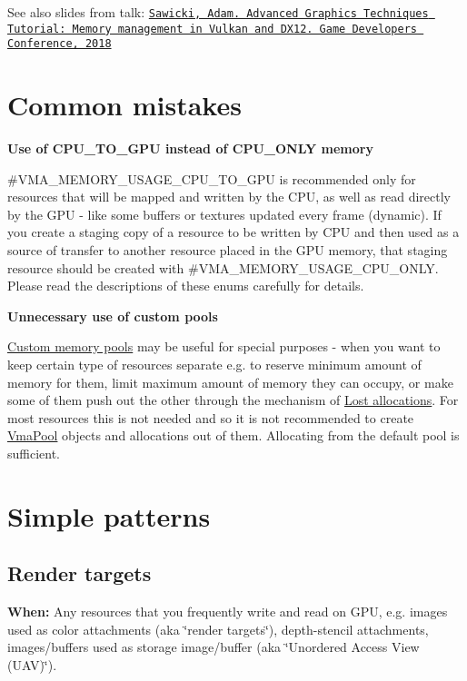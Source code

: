 See also slides from talk\+: \href{https://www.gdcvault.com/play/1025458/Advanced-Graphics-Techniques-Tutorial-New}{\tt Sawicki, Adam. Advanced Graphics Techniques Tutorial\+: Memory management in Vulkan and D\+X12. Game Developers Conference, 2018}\hypertarget{usage_patterns_usage_patterns_common_mistakes}{}\section{Common mistakes}\label{usage_patterns_usage_patterns_common_mistakes}
{\bfseries Use of C\+P\+U\+\_\+\+T\+O\+\_\+\+G\+PU instead of C\+P\+U\+\_\+\+O\+N\+LY memory}

\#\+V\+M\+A\+\_\+\+M\+E\+M\+O\+R\+Y\+\_\+\+U\+S\+A\+G\+E\+\_\+\+C\+P\+U\+\_\+\+T\+O\+\_\+\+G\+PU is recommended only for resources that will be mapped and written by the C\+PU, as well as read directly by the G\+PU -\/ like some buffers or textures updated every frame (dynamic). If you create a staging copy of a resource to be written by C\+PU and then used as a source of transfer to another resource placed in the G\+PU memory, that staging resource should be created with \#\+V\+M\+A\+\_\+\+M\+E\+M\+O\+R\+Y\+\_\+\+U\+S\+A\+G\+E\+\_\+\+C\+P\+U\+\_\+\+O\+N\+LY. Please read the descriptions of these enums carefully for details.

{\bfseries Unnecessary use of custom pools}

\hyperlink{custom_memory_pools}{Custom memory pools} may be useful for special purposes -\/ when you want to keep certain type of resources separate e.\+g. to reserve minimum amount of memory for them, limit maximum amount of memory they can occupy, or make some of them push out the other through the mechanism of \hyperlink{lost_allocations}{Lost allocations}. For most resources this is not needed and so it is not recommended to create \hyperlink{structVmaPool}{Vma\+Pool} objects and allocations out of them. Allocating from the default pool is sufficient.\hypertarget{usage_patterns_usage_patterns_simple}{}\section{Simple patterns}\label{usage_patterns_usage_patterns_simple}
\hypertarget{usage_patterns_usage_patterns_simple_render_targets}{}\subsection{Render targets}\label{usage_patterns_usage_patterns_simple_render_targets}
{\bfseries When\+:} Any resources that you frequently write and read on G\+PU, e.\+g. images used as color attachments (aka \char`\"{}render targets\char`\"{}), depth-\/stencil attachments, images/buffers used as storage image/buffer (aka \char`\"{}\+Unordered Access View (\+U\+A\+V)\char`\"{}).

